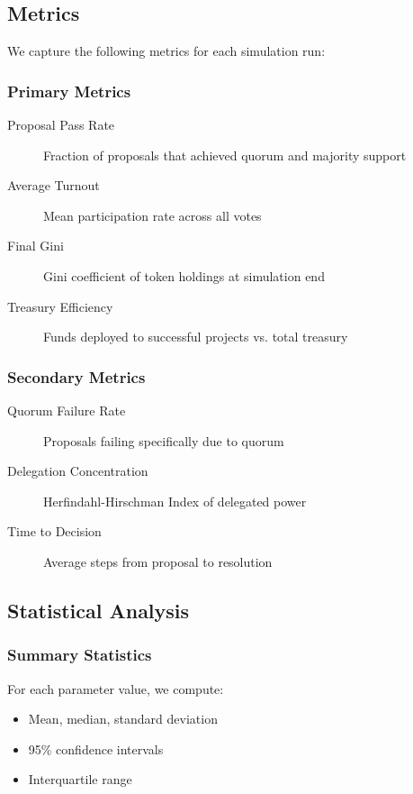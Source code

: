 \subsection{Metrics}

We capture the following metrics for each simulation run:

\subsubsection{Primary Metrics}

\begin{description}
    \item[Proposal Pass Rate] Fraction of proposals that achieved quorum and majority support
    \item[Average Turnout] Mean participation rate across all votes
    \item[Final Gini] Gini coefficient of token holdings at simulation end
    \item[Treasury Efficiency] Funds deployed to successful projects vs. total treasury
\end{description}

\subsubsection{Secondary Metrics}

\begin{description}
    \item[Quorum Failure Rate] Proposals failing specifically due to quorum
    \item[Delegation Concentration] Herfindahl-Hirschman Index of delegated power
    \item[Time to Decision] Average steps from proposal to resolution
\end{description}

\subsection{Statistical Analysis}

\subsubsection{Summary Statistics}

For each parameter value, we compute:
\begin{itemize}
    \item Mean, median, standard deviation
    \item 95\% confidence intervals
    \item Interquartile range
\end{itemize}


